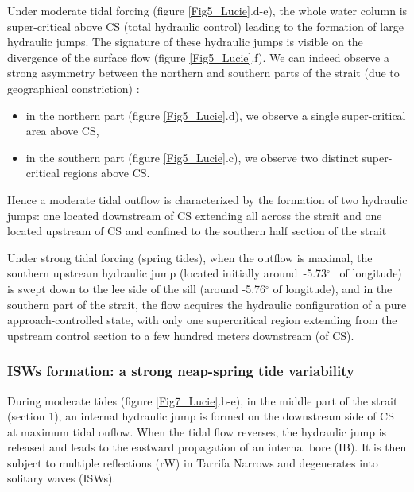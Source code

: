 \vspace{\baselineskip}
Under moderate tidal forcing (figure \ref{Fig5_Lucie}.d-e), the whole water column is super-critical above CS (total hydraulic control) leading to the formation of large hydraulic jumps. The signature of these hydraulic jumps is visible on the divergence of the surface flow (figure \ref{Fig5_Lucie}.f). We can indeed observe a strong asymmetry between the northern and southern parts of the strait (due to geographical constriction) :\par

\begin{itemize}
	\item in the northern part (figure \ref{Fig5_Lucie}.d), we observe a single super-critical area above CS,\par

	\item in the southern part (figure \ref{Fig5_Lucie}.c), we observe two distinct super-critical regions above CS.
\end{itemize}\par

Hence a moderate tidal outflow is characterized by the formation of two hydraulic jumps: one located downstream of CS extending all across the strait and one located upstream of CS and confined to the southern half section of the strait\par

\vspace{\baselineskip}
Under strong tidal forcing (spring tides), when the outflow is maximal, the southern upstream hydraulic jump (located initially around\  -5.73$ ^{\circ} $ \ of longitude) is swept down to the lee side of the sill (around  -5.76$ ^{\circ} $  of longitude), and in the southern part of the strait, the flow acquires the hydraulic configuration of a pure approach-controlled state, with only one supercritical region extending from the upstream control section to a few hundred meters downstream (of CS).\par

\vspace{\baselineskip}
\subsubsection{ ISWs formation: a strong neap-spring tide variability}

\vspace{\baselineskip}
 During moderate tides (figure \ref{Fig7_Lucie}.b-e), in the middle part of the strait (section 1), an internal hydraulic jump is formed on the downstream side of CS at maximum tidal ouflow. When the tidal flow reverses, the hydraulic jump is released and leads to the eastward propagation of an internal bore (IB). It is then subject to multiple reflections (rW) in Tarrifa Narrows and degenerates into solitary waves (ISWs).\par

